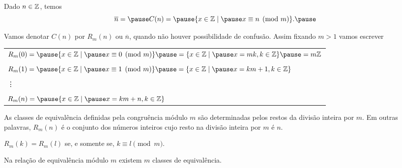 \documentclass{beamer}
\begin{document}
    \begin{frame}
        Dado $n \in \mathbb{Z}$, temos\pause
        \[
            \overline{n} = \pause C(n) = \pause \{x \in \z \mid \pause x\equiv n \pmod{m}\}.\pause
        \]

        Vamos denotar $C(n)$ \pause por $R_{m}(n)$ \pause ou $\overline{n}$, \pause quando não houver possibilidade de confusão. \pause Assim fixando $m > 1$ vamos escrever\pause
        \begin{center}
            \begin{tabular}{l}
                $R_{m}(0) = \pause \{x \in \z \mid \pause x\equiv 0 \pmod{m}\} \pause =\{x \in \z \mid \pause x = mk, k \in \z\}\pause = m\z$\pause\\
                \\
                $R_{m}(1) = \pause \{x \in \z \mid \pause x\equiv 1 \pmod{m}\} \pause = \{x \in \z \mid \pause x = km + 1, k \in \z \}$\pause \\
                \\
                \vdots\\
                \\
                $R_{m}(n) = \pause \{x \in \z \mid \pause x = km + n, k \in \z \}$
            \end{tabular}
        \end{center}
    \end{frame}

    \begin{frame}
        \begin{proposicao}
            As classes de equivalência definidas pela congruência módulo $m$ \pause são determinadas pelos restos da divisão inteira por $m$. \pause Em outras palavras, $R_{m}(n)$ \pause é o conjunto dos números inteiros \pause cujo resto na divisão inteira por $m$ é $n$.\pause
        \end{proposicao}

        \begin{corolario}
            $R_{m}(k) = R_{m}(l)$ \pause se, e somente se, $k\equiv l \pmod{m}$.
        \end{corolario}
    \end{frame}

    \begin{frame}
        \begin{proposicao}
            Na relação de equivalência módulo $m$ existem $m$ classes de equivalência.\pause
        \end{proposicao}
    \end{frame}
\end{document}
